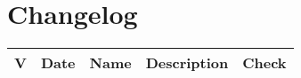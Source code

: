 \section*{Changelog} %

\begin{longtable}{
		>{\centering}p{}	%
		>{\centering}p{}	%
		>{\centering}p{}	%
		>{}p{}			%
		>{\centering}p{} }	%

	\textbf{\color{white}V} &
	\textbf{\color{white}Date} &
	\textbf{\color{white}Name} &
	\textbf{\color{white}Description} &
	\textbf{\color{white}Check}
	\tabularnewline
	\endhead

	

\end{longtable}
